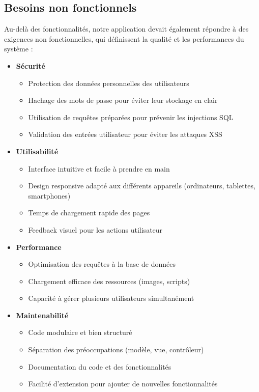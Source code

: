 \documentclass[a4paper,12pt]{article}
\begin{document}
\subsection{Besoins non fonctionnels}

Au-delà des fonctionnalités, notre application devait également répondre à des exigences non fonctionnelles, qui définissent la qualité et les performances du système :

\begin{itemize}
  \item \textbf{Sécurité}
  \begin{itemize}
    \item Protection des données personnelles des utilisateurs
    \item Hachage des mots de passe pour éviter leur stockage en clair
    \item Utilisation de requêtes préparées pour prévenir les injections SQL
    \item Validation des entrées utilisateur pour éviter les attaques XSS
  \end{itemize}

  \item \textbf{Utilisabilité}
  \begin{itemize}
    \item Interface intuitive et facile à prendre en main
    \item Design responsive adapté aux différents appareils (ordinateurs, tablettes, smartphones)
    \item Temps de chargement rapide des pages
    \item Feedback visuel pour les actions utilisateur
  \end{itemize}

  \item \textbf{Performance}
  \begin{itemize}
    \item Optimisation des requêtes à la base de données
    \item Chargement efficace des ressources (images, scripts)
    \item Capacité à gérer plusieurs utilisateurs simultanément
  \end{itemize}

  \item \textbf{Maintenabilité}
  \begin{itemize}
    \item Code modulaire et bien structuré
    \item Séparation des préoccupations (modèle, vue, contrôleur)
    \item Documentation du code et des fonctionnalités
    \item Facilité d'extension pour ajouter de nouvelles fonctionnalités
  \end{itemize}


\end{itemize}
\end{document}
